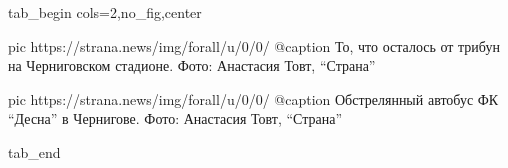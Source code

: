  
 
 
 
 

\ifcmt
  tab_begin cols=2,no_fig,center

     pic https://strana.news/img/forall/u/0/0/%
		 @caption То, что осталось от трибун на Черниговском стадионе. Фото: Анастасия Товт, \enquote{Страна}

		 pic https://strana.news/img/forall/u/0/0/%
		 @caption Обстрелянный автобус ФК \enquote{Десна} в Чернигове. Фото: Анастасия Товт, \enquote{Страна}

  tab_end
\fi
